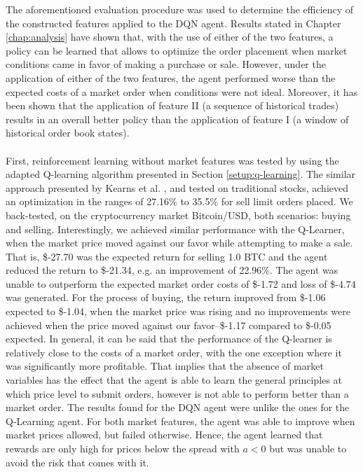     The aforementioned evaluation procedure was used to determine the efficiency of the constructed features applied to the DQN agent.
    Results stated in Chapter \ref{chap:analysis} have shown that, with the use of either of the two features, a policy can be learned that allows to optimize the order placement when market conditions came in favor of making a purchase or sale.
    However, under the application of either of the two features, the agent performed worse than the expected costs of a market order when conditions were not ideal.
    Moreover, it has been shown that the application of feature II (a sequence of historical trades) results in an overall better policy than the application of feature I (a window of historical order book states).
    \\
    \\
    First, reinforcement learning without market features was tested by using the adapted Q-learning algorithm presented in Section \ref{setup:q-learning}.
    The similar approach presented by Kearns et al. \cite{nevmyvaka2006reinforcement}, and tested on traditional stocks, achieved an optimization in the ranges of 27.16\% to 35.5\% for sell limit orders placed.
    We back-tested, on the cryptocurrency market Bitcoin/USD, both scenarios: buying and selling.
    Interestingly, we achieved similar performance with the Q-Learner, when the market price moved against our favor while attempting to make a sale.
    That is, \$-27.70 was the expected return for selling 1.0 BTC and the agent reduced the return to \$-21.34, e.g. an improvement of 22.96\%.
    The agent was unable to outperform the expected market order costs of \$-1.72 and loss of \$-4.74 was generated.
    For the process of buying, the return improved from \$-1.06 expected to \$-1.04, when the market price was rising and no improvements were achieved when the price moved against our favor--\$-1.17 compared to \$-0.05 expected.
    In general, it can be said that the performance of the Q-learner is relatively close to the costs of a market order, with the one exception where it was significantly more profitable.
    That implies that the absence of market variables has the effect that the agent is able to learn the general principles at which price level to submit orders, however is not able to perform better than a market order.
    The results found for the DQN agent were unlike the ones for the Q-Learning agent. 
    For both market features, the agent was able to improve when market prices allowed, but failed otherwise.
    Hence, the agent learned that rewards are only high for prices below the spread with $a<0$ but was unable to avoid the risk that comes with it.
